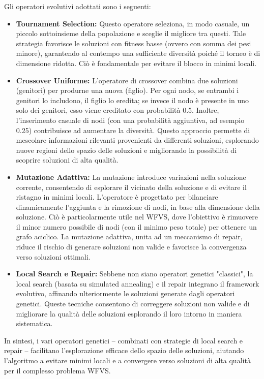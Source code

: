 \documentclass[12pt,a4paper,twoside]{article}
\begin{document}
Gli operatori evolutivi adottati sono i seguenti:
\begin{itemize}
    \item \textbf{Tournament Selection:} Questo operatore seleziona, in modo casuale, un piccolo sottoinsieme della popolazione e sceglie il migliore tra questi. Tale strategia favorisce le soluzioni con fitness basse (ovvero con somma dei pesi minore), garantendo al contempo una sufficiente diversità poiché il torneo è di dimensione ridotta. Ciò è fondamentale per evitare il blocco in minimi locali.
    \item \textbf{Crossover Uniforme:} L'operatore di crossover combina due soluzioni (genitori) per produrne una nuova (figlio). Per ogni nodo, se entrambi i genitori lo includono, il figlio lo eredita; se invece il nodo è presente in uno solo dei genitori, esso viene ereditato con probabilità 0.5. Inoltre, l'inserimento casuale di nodi (con una probabilità aggiuntiva, ad esempio 0.25) contribuisce ad aumentare la diversità. Questo approccio permette di mescolare informazioni rilevanti provenienti da differenti soluzioni, esplorando nuove regioni dello spazio delle soluzioni e migliorando la possibilità di scoprire soluzioni di alta qualità.
    \item \textbf{Mutazione Adattiva:} La mutazione introduce variazioni nella soluzione corrente, consentendo di esplorare il vicinato della soluzione e di evitare il ristagno in minimi locali. L'operatore è progettato per bilanciare dinamicamente l'aggiunta e la rimozione di nodi, in base alla dimensione della soluzione. Ciò è particolarmente utile nel WFVS, dove l'obiettivo è rimuovere il minor numero possibile di nodi (con il minimo peso totale) per ottenere un grafo aciclico. La mutazione adattiva, unita ad un meccanismo di repair, riduce il rischio di generare soluzioni non valide e favorisce la convergenza verso soluzioni ottimali.
    \item \textbf{Local Search e Repair:} Sebbene non siano operatori genetici "classici", la local search (basata su simulated annealing) e il repair integrano il framework evolutivo, affinando ulteriormente le soluzioni generate dagli operatori genetici. Queste tecniche consentono di correggere soluzioni non valide e di migliorare la qualità delle soluzioni esplorando il loro intorno in maniera sistematica.
\end{itemize}

In sintesi, i vari operatori genetici – combinati con strategie di local search e repair – facilitano l'esplorazione efficace dello spazio delle soluzioni, aiutando l'algoritmo a evitare minimi locali e a convergere verso soluzioni di alta qualità per il complesso problema WFVS.
\end{document}
